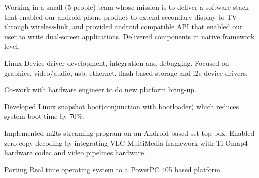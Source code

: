 \documentclass[letterpaper]{deedy-resume} %
\begin{document}
\begin{minipage}[t]{0.66\textwidth}
\sectionspace %



\begin{tightitemize}
\item Working in a small (5 people) team whose mission is to deliver a software stack that enabled our android phone product to extend secondary display to TV through wireless-link, and provided android compatible API that enabled our user to write dual-screen applications. Delivered components in native framework level.
\end{tightitemize}

\sectionspace %



\begin{tightitemize}
\item Linux Device driver development, integration and debugging. Focused on graphics, video/audio, usb, ethernet, flash based storage and i2c device drivers.
\item Co-work with hardware engineer to do new platform bring-up.
\item Developed Linux snapshot boot(conjunction with bootloader) which reduces system boot time by 70\%.
\item Implemented m2ts streaming program on an Android based set-top box. Enabled zero-copy decoding by integrating VLC MultiMedia framework with Ti Omap4 hardware codec and video pipelines hardware.
\item Porting Real time operating system to a PowerPC 405 based platform.
\end{tightitemize}

\sectionspace %

\end{minipage} %


\begin{minipage}[t]{0.33\textwidth} %
\end{minipage}
\hfill
\end{document}
